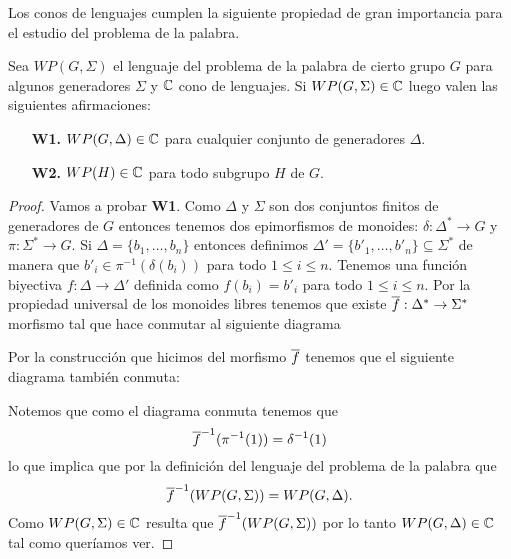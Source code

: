 \documentclass[tesis.tex]{subfiles}
\begin{document}
Los conos de lenguajes cumplen la siguiente propiedad de gran importancia para el estudio del problema de la palabra.
\medskip
\begin{prop}\label{prop-cono-wp}
	Sea $WP(G, \Sigma)$ el lenguaje del problema de la palabra de cierto grupo $G$ para algunos generadores $\Sigma$ y $\mathbb{C}$ cono de lenguajes. 
	Si $WP(G, \Sigma) \in \mathbb{C}$ luego valen las siguientes afirmaciones:
	\begin{itemize}
		\item[\textbf{W1.}] $WP(G, \Delta) \in \mathbb{C}$ para cualquier conjunto de generadores $\Delta$.
		\item[\textbf{W2.}] $WP(H) \in \mathbb{C}$ para todo subgrupo $H$ \fg de $G$.
	\end{itemize} 
\end{prop}
\begin{proof}
	Vamos a probar \textbf{W1}.
	Como $\Delta$ y $\Sigma$ son dos conjuntos finitos de generadores de $G$ entonces tenemos dos epimorfismos de monoides:
	$\delta: \Delta^* \to G$ y $\pi:\Sigma^* \to G$.
	Si $\Delta = \{ b_{1}, \dots, b_{n} \}$ entonces definimos $\Delta' = \{ b'_{1}, \dots, b'_{n}   \} \subseteq \Sigma^*$ de manera que $b'_{i} \in \pi^{-1}(\delta(b_{i}))$ para todo $1 \le i \le n$.
	Tenemos una función biyectiva $f:\Delta \to \Delta'$ definida como $f(b_{i}) = b'_{i}$ para todo $1 \le i \le n$.
	Por la propiedad universal de los monoides libres tenemos que existe $\overline f: \Delta^* \to \Sigma^*$ morfismo tal que hace conmutar al siguiente diagrama
	\begin{center}
	\end{center}
	
	Por la construcción que hicimos del morfismo $\overline f$ tenemos que el siguiente diagrama también conmuta:
	\begin{center}
	\end{center}
	
	Notemos que como el diagrama conmuta tenemos que 
	\[
	\overline{f}^{-1}(\pi^{-1}(1)) = \delta^{-1}(1)
	\]
	lo que implica que por la definición del lenguaje del problema de la palabra que
	\[
	\overline{f}^{-1}(WP(G,\Sigma)) = WP(G, \Delta).
	\]
	Como $WP(G, \Sigma) \in \mathbb{C}$ resulta que $\overline{f}^{-1}(WP(G,\Sigma))$ por lo tanto $WP(G, \Delta) \in \mathbb{C}$ tal como queríamos ver.
	

\end{proof}
\end{document}
